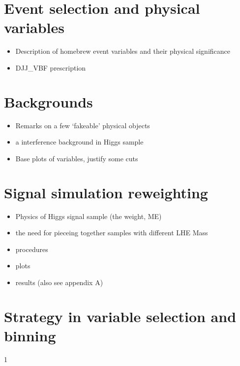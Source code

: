 \newpage

\section{Event selection and physical variables}
\begin{itemize}
    \item Description of homebrew event variables and their physical significance
    \item DJJ\_VBF prescription
\end{itemize}
\newpage\phantom{blabla}
\newpage\phantom{blabla}


\section{Backgrounds}
\begin{itemize}
    \item Remarks on a few `fakeable' physical objects
    \item a interference background in Higgs sample
    \item Base plots of variables, justify some cuts
\end{itemize}
\newpage\phantom{blabla}


\section{Signal simulation reweighting}
\begin{itemize}
    \item Physics of Higgs signal sample (the weight, ME)
    \item the need for pieceing together samples with different LHE Mass
    \item procedures
    \item plots
    \item results (also see appendix A)
\end{itemize}
\newpage\phantom{blabla}
\newpage\phantom{blabla}
\newpage\phantom{blabla}
\newpage\phantom{blabla}


\section{Strategy in variable selection and binning}
\newpage\phantom{blabla}
\newpage\phantom{blabla}
1
